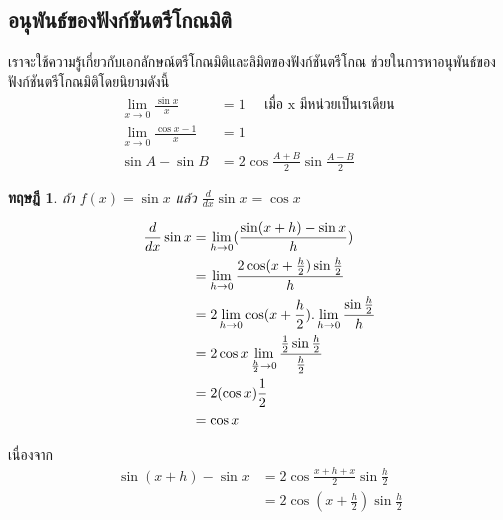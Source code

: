 \documentclass[
]{book}
\newtheorem{theorem}{ทฤษฎี}[chapter]
\theoremstyle{definition}
\theoremstyle{definition}
\theoremstyle{definition}
\theoremstyle{definition}
\theoremstyle{remark}
\begin{document}
\subsection{อนุพันธ์ของฟังก์ชันตรีโกณมิติ}\label{uxe2duxe19uxe1euxe19uxe18uxe02uxe2duxe07uxe1fuxe07uxe01uxe0auxe19uxe15uxe23uxe42uxe01uxe13uxe21uxe15}

เราจะใช้ความรู้เกี่ยวกับเอกลักษณ์ตรีโกณมิติและลิมิตของฟังก์ชันตรีโกณ
ช่วยในการหาอนุพันธ์ของฟังก์ชันตรีโกณมิติโดยนิยามดังนี้\\
\begin{equation}   \begin{aligned}
 \lim_{x\rightarrow 0} \frac{\sin x}{x}    &= 1  \quad \text{ เมื่อ x มีหน่วยเป็นเรเดียน }\\
 \lim_{x\rightarrow 0} \frac{\cos x -1}{x} &= 1  \\
    \sin A- \sin B                         &=2 \cos \frac{A+B}{2}\sin \frac{A-B}{2}
  \end{aligned} \end{equation}

\begin{theorem}
ถ้า \(f(x)=\sin x\) แล้ว \(\displaystyle \frac{d}{dx}\sin x =\cos x\)
\end{theorem}

\begin{equation}   \begin{aligned}
\displaystyle \frac{d}{dx}\sin x&=\lim_{h\rightarrow 0}(\frac{\sin
(x+h)-\sin x}{h})\\
\displaystyle  &=\lim_{h\rightarrow0} \frac{2\cos
(x+\frac{h}{2})\sin \frac{h}{2}}{h}\\
\displaystyle &=2\lim_{h\rightarrow 0}\cos
(x+\frac{h}{2}).\lim_{h\rightarrow 0} \frac{\sin \frac{h}{2}}{h}\\
\displaystyle &=2\cos x\lim_{\frac{h}{2} \rightarrow 0}\frac{\frac{1}{2}\sin
\frac{h}{2}}{\frac{h}{2}}\\
\displaystyle &=2(\cos x)\frac{1}{2}\\
&=\cos x
  \end{aligned} \end{equation}

เนื่องจาก \begin{equation}   \begin{aligned}
 \sin (x+h)- \sin x &=2\cos \frac{x+h+x}{2}\sin \frac{h}{2}\\
                        &=2\cos (x+\frac{h}{2})\sin \frac{h}{2}
  \end{aligned} \end{equation}
\end{document}
